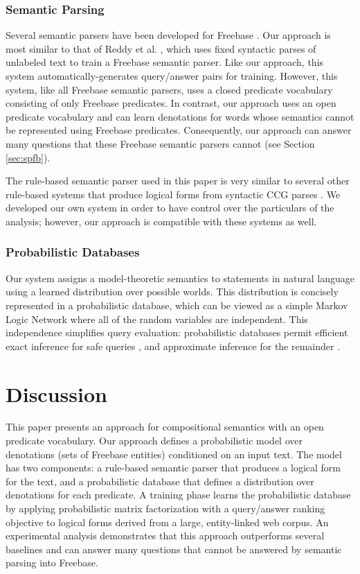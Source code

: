 \documentclass[11pt]{article}
\begin{document}
\subsubsection*{Semantic Parsing}

Several semantic parsers have been developed for Freebase
\cite{cai2013acl,kwiatkowski2013,berant2013,berant2014}. Our approach
is most similar to that of Reddy et al. , which
uses fixed syntactic parses of unlabeled text to train a Freebase
semantic parser. Like our approach, this system
automatically-generates query/answer pairs for training. However, this
system, like all Freebase semantic parsers, uses a closed predicate
vocabulary consisting of only Freebase predicates. In contrast, our
approach uses an open predicate vocabulary and can learn denotations
for words whose semantics cannot be represented using Freebase
predicates. Consequently, our approach can answer many questions that
these Freebase semantic parsers cannot (see Section \ref{sec:spfb}).

The rule-based semantic parser used in this paper is very similar to
several other rule-based systems that produce logical forms from
syntactic CCG parses \cite{bos2008,lewis2013}. We developed our own
system in order to have control over the particulars of the analysis;
however, our approach is compatible with these systems as well.

\subsubsection*{Probabilistic Databases}

Our system assigns a model-theoretic semantics to statements in
natural language \cite{dowty81} using a learned distribution over
possible worlds. This distribution is concisely represented in a
probabilistic database, which can be viewed as a simple Markov Logic
Network \cite{richardson2006} where all of the random variables are
independent. This independence simplifies query evaluation:
probabilistic databases permit efficient exact inference for safe
queries \cite{suciu2011probabilistic}, and approximate inference for
the remainder \cite{gatterbauer2010,gatterbauer2015}.


\section{Discussion}
\label{sec:discussion}

This paper presents an approach for compositional semantics with an
open predicate vocabulary. Our approach defines a probabilistic model
over denotations (sets of Freebase entities) conditioned on an input
text. The model has two components: a rule-based semantic parser that
produces a logical form for the text, and a probabilistic database
that defines a distribution over denotations for each predicate. A
training phase learns the probabilistic database by applying
probabilistic matrix factorization with a query/answer ranking
objective to logical forms derived from a large, entity-linked web
corpus. An experimental analysis demonstrates that this approach
outperforms several baselines and can answer many questions that
cannot be answered by semantic parsing into Freebase.
\end{document}
